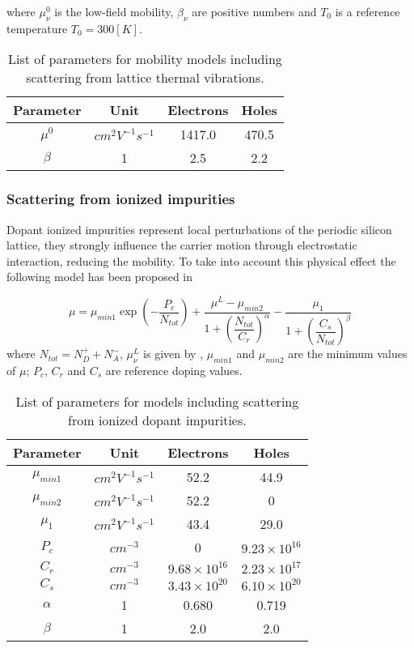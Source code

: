 where $\mu_\nu^0$ is the low-field mobility, $\beta_\nu$ are positive numbers and $T_0$ is a reference temperature $T_0=300[K]$.

\begin{table}[!h]
\centering
\begin{tabular}{cccc}
\toprule
Parameter & Unit & Electrons & Holes \\
\midrule
$\mu^0$ & $cm^2V^{-1}s^{-1}$ & 1417.0 & 470.5\\
$\beta$ & 1 & 2.5 & 2.2\\
\bottomrule
\end{tabular}
\caption{List of parameters for mobility models including scattering from lattice thermal vibrations.}
\end{table}

\subsubsection{Scattering from ionized impurities}
\label{sec: Masetti model}

Dopant ionized impurities represent local perturbations of the periodic silicon lattice, they strongly influence the carrier motion through electrostatic interaction, reducing the mobility. To take into account this physical effect the following model has been proposed in \cite{Masetti:MobDop}


\begin{equation}
\label{eq: mobility impurities}
\mu = \mu_{min1}\exp\left( 	- \dfrac{P_c}{N_{tot}}\right)
 + \dfrac{\mu^L-\mu_{min2}}{1 + \left( \dfrac{N_{tot}}{C_r} \right)^{\alpha} } 
 - \dfrac{\mu_1}{1 + \left( \dfrac{C_s}{N_{tot}} \right)^{\beta} } 
\end{equation}
where $N_{tot} = N_D^+ + N_A^-$, $\mu_\nu^L$ is given by , $\mu_{min1}$ and $\mu_{min2}$  are the minimum values of $\mu$; $P_c$, $C_r$ and $C_s$ are reference doping values.


\begin{table}[!h]
\centering
\begin{tabular}{cccc}
\toprule
Parameter & Unit & Electrons & Holes \\
\midrule
$\mu_{min1}$ & $cm^2V^{-1}s^{-1}$ & 52.2 & 44.9\\
$\mu_{min2}$ & $cm^2V^{-1}s^{-1}$ & 52.2 & 0\\
$\mu_1$ & $cm^2V^{-1}s^{-1}$ & 43.4 & 29.0 \\
$P_c$ & $cm^{-3}$ & 0 & $9.23\times 10^{16}$\\
$C_r$ & $cm^{-3}$ &  $9.68\times 10^{16}$ & $2.23\times 10^{17}$ \\
$C_s$ & $cm^{-3}$ & $3.43\times 10^{20}$ & $6.10\times 10^{20}$\\
$\alpha$& 1 & 0.680 & 0.719  \\
$\beta$& 1 & 2.0 & 2.0 \\
\bottomrule
\end{tabular}
\caption{List of parameters for models including scattering from ionized dopant impurities.}
\end{table}


